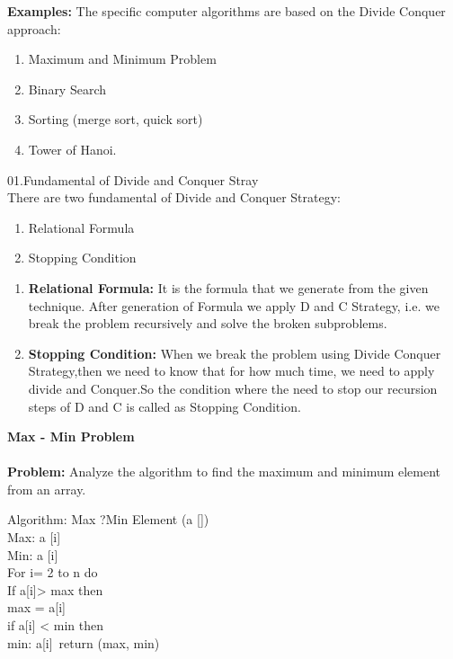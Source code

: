 \documentclass{article}
\begin{document}
\textbf{Examples:} 
The specific computer algorithms are based on the Divide  Conquer approach:
\\
\begin{enumerate}
\item 
Maximum and Minimum Problem
\item Binary Search
\item Sorting (merge sort, quick sort)
\item Tower of Hanoi.
\end{enumerate}

\huge{01.Fundamental of Divide and Conquer Stray}\\

There are two fundamental of Divide and Conquer Strategy:
\begin{enumerate}
\item Relational Formula
\item Stopping Condition
\end{enumerate}
\begin{enumerate}
\item \textbf{Relational Formula:}
It is the formula that we generate from the given technique. After generation of Formula we apply D and C Strategy, i.e. we break the problem recursively and solve the broken subproblems.\\
\item \textbf{Stopping Condition:}
When we break the problem using Divide  Conquer Strategy,then we need to know that for how much time, we need to apply divide and Conquer.So the condition where the need to stop our recursion steps of D and C is called as Stopping Condition.\\
\end{enumerate} 
\textbf{\huge{Max - Min Problem}}\\
\\
\textbf{Problem:}
Analyze the algorithm to find the maximum and minimum element from an array.\\
\begin{center}Algorithm: Max ?Min Element (a [])\\
Max:  a [i]\\
Min:   a [i]\\
For i= 2 to n do\\
If a[i]> max then\\
max = a[i]\\
if a[i] < min then\\
min: a[i]\
return (max, min)\\
\end{center}
\end{document}

